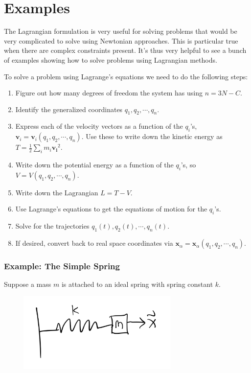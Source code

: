 \documentclass[
  letterpaper,
  DIV=11,
  numbers=noendperiod]{scrreprt}
\providecommand{\tightlist}{%
  \setlength{\itemsep}{0pt}\setlength{\parskip}{0pt}}\usepackage{longtable,booktabs,array}
\begin{document}
\hypertarget{examples-1}{%
\section{Examples}\label{examples-1}}

The Lagrangian formulation is very useful for solving problems that
would be very complicated to solve using Newtonian approaches. This is
particular true when there are complex constraints present. It's thus
very helpful to see a bunch of examples showing how to solve problems
using Lagrangian methods.

To solve a problem using Lagrange's equations we need to do the
following steps:

\begin{enumerate}
\def\labelenumi{\arabic{enumi}.}
\tightlist
\item
  Figure out how many degrees of freedom the system has using
  \(n=3N-C\).
\item
  Identify the generalized coordinates \(q_1,q_2,\cdots,q_n\).
\item
  Express each of the velocity vectors as a function of the \(q_i\)'s,
  \(\mathbf{v}_i = \mathbf{v}_i(q_1,q_2,\cdots,q_n)\). Use these to
  write down the kinetic energy as
  \(T = \frac{1}{2}\sum_i m_i \mathbf{v_i}^2\).
\item
  Write down the potential energy as a function of the \(q_i\)'s, so
  \(V=V(q_1,q_2,\cdots,q_n)\).
\item
  Write down the Lagrangian \(L = T - V\).
\item
  Use Lagrange's equations to get the equations of motion for the
  \(q_i\)'s.
\item
  Solve for the trajectories \(q_1(t),q_2(t),\cdots,q_n(t)\).
\item
  If desired, convert back to real space coordinates via
  \(\mathbf{x}_\alpha = \mathbf{x}_\alpha(q_1,q_2,\cdots,q_n)\).
\end{enumerate}

\hypertarget{example-the-simple-spring}{%
\subsubsection{Example: The Simple
Spring}\label{example-the-simple-spring}}

Suppose a mass \(m\) is attached to an ideal spring with spring constant
\(k\).

\begin{figure}

{\centering \includegraphics[width=3.125in,height=\textheight]{classical-mechanics/./resources/image-20230218211506460.png}

}

\end{figure}
\end{document}
